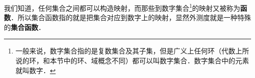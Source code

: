 

我们知道，任何集合之间都可以构造映射，而那些到数字集合\footnote{一般来说，数字集合指的是复数集合及其子集，但是广义上任何环（代数上所说的环，和本节中的环、域概念不同）都可以叫数字集合．数字集合中的元素就叫数字．}的映射又被称为\textbf{函数}．所以集合函数指的就是把集合对应到数字上的映射，显然外测度就是一种特殊的\textbf{集合函数}．





















